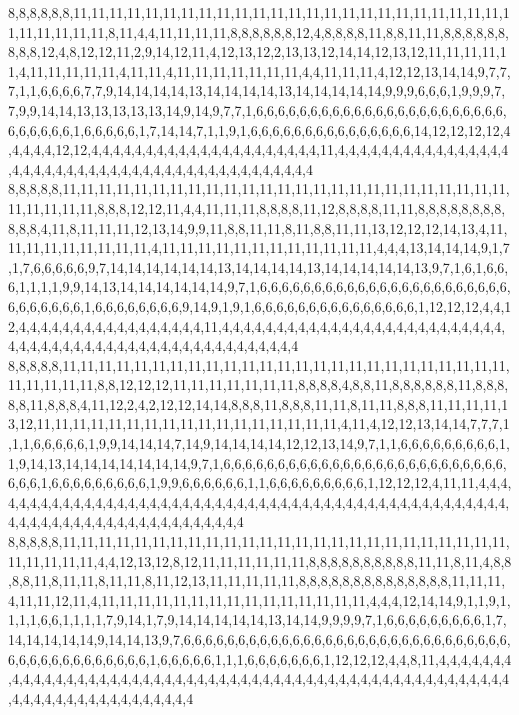 8,8,8,8,8,8,11,11,11,11,11,11,11,11,11,11,11,11,11,11,11,11,11,11,11,11,11,11,11,11,11,11,11,11,11,11,8,11,4,4,11,11,11,11,8,8,8,8,8,8,12,4,8,8,8,8,11,8,8,11,11,8,8,8,8,8,8,8,8,8,12,4,8,12,12,11,2,9,14,12,11,4,12,13,12,2,13,13,12,14,14,12,13,12,11,11,11,11,11,4,11,11,11,11,11,4,11,11,4,11,11,11,11,11,11,11,4,4,11,11,11,4,12,12,13,14,14,9,7,7,7,1,1,6,6,6,6,7,7,9,14,14,14,14,13,14,14,14,14,13,14,14,14,14,14,9,9,9,6,6,6,1,9,9,9,7,7,9,9,14,14,13,13,13,13,13,14,9,14,9,7,7,1,6,6,6,6,6,6,6,6,6,6,6,6,6,6,6,6,6,6,6,6,6,6,6,6,6,6,6,6,6,1,6,6,6,6,6,1,7,14,14,7,1,1,9,1,6,6,6,6,6,6,6,6,6,6,6,6,6,6,6,14,12,12,12,12,4,4,4,4,4,12,12,4,4,4,4,4,4,4,4,4,4,4,4,4,4,4,4,4,4,4,4,4,11,4,4,4,4,4,4,4,4,4,4,4,4,4,4,4,4,4,4,4,4,4,4,4,4,4,4,4,4,4,4,4,4,4,4,4,4,4,4,4,4,4,4,4,4
8,8,8,8,8,11,11,11,11,11,11,11,11,11,11,11,11,11,11,11,11,11,11,11,11,11,11,11,11,11,11,11,11,11,11,8,8,8,12,12,11,4,4,11,11,11,8,8,8,8,11,12,8,8,8,8,11,11,8,8,8,8,8,8,8,8,8,8,8,4,11,8,11,11,11,12,13,14,9,9,11,8,8,11,11,8,11,8,8,11,11,13,12,12,12,14,13,4,11,11,11,11,11,11,11,11,11,4,11,11,11,11,11,11,11,11,11,11,11,11,4,4,4,13,14,14,14,9,1,7,1,7,6,6,6,6,6,9,7,14,14,14,14,14,14,13,14,14,14,14,13,14,14,14,14,14,13,9,7,1,6,1,6,6,6,1,1,1,1,9,9,14,13,14,14,14,14,14,14,9,7,1,6,6,6,6,6,6,6,6,6,6,6,6,6,6,6,6,6,6,6,6,6,6,6,6,6,6,6,6,6,6,1,6,6,6,6,6,6,6,6,9,14,9,1,9,1,6,6,6,6,6,6,6,6,6,6,6,6,6,6,6,1,12,12,12,4,4,12,4,4,4,4,4,4,4,4,4,4,4,4,4,4,4,4,4,11,4,4,4,4,4,4,4,4,4,4,4,4,4,4,4,4,4,4,4,4,4,4,4,4,4,4,4,4,4,4,4,4,4,4,4,4,4,4,4,4,4,4,4,4,4,4,4,4,4,4,4,4,4
8,8,8,8,8,11,11,11,11,11,11,11,11,11,11,11,11,11,11,11,11,11,11,11,11,11,11,11,11,11,11,11,11,11,11,8,8,12,12,12,11,11,11,11,11,11,11,8,8,8,8,4,8,8,11,8,8,8,8,8,8,11,8,8,8,8,8,11,8,8,8,4,11,12,2,4,2,12,12,14,14,8,8,8,11,8,8,8,11,11,8,11,11,8,8,8,11,11,11,11,13,12,11,11,11,11,11,11,11,11,11,11,11,11,11,11,11,11,11,4,11,4,12,12,13,14,14,7,7,7,1,1,1,6,6,6,6,6,1,9,9,14,14,14,7,14,9,14,14,14,14,12,12,13,14,9,7,1,1,6,6,6,6,6,6,6,6,6,1,1,9,14,13,14,14,14,14,14,14,14,9,7,1,6,6,6,6,6,6,6,6,6,6,6,6,6,6,6,6,6,6,6,6,6,6,6,6,6,6,6,6,6,1,6,6,6,6,6,6,6,6,6,1,9,9,6,6,6,6,6,6,1,1,6,6,6,6,6,6,6,6,6,1,12,12,12,4,11,11,4,4,4,4,4,4,4,4,4,4,4,4,4,4,4,4,4,4,4,4,4,4,4,4,4,4,4,4,4,4,4,4,4,4,4,4,4,4,4,4,4,4,4,4,4,4,4,4,4,4,4,4,4,4,4,4,4,4,4,4,4,4,4,4,4,4,4,4,4,4,4
8,8,8,8,8,11,11,11,11,11,11,11,11,11,11,11,11,11,11,11,11,11,11,11,11,11,11,11,11,11,11,11,11,11,11,4,4,12,13,12,8,12,11,11,11,11,11,11,8,8,8,8,8,8,8,8,8,8,11,11,8,11,4,8,8,8,8,11,8,11,11,8,11,11,8,11,12,13,11,11,11,11,11,8,8,8,8,8,8,8,8,8,8,8,8,8,8,11,11,11,4,11,11,12,11,4,11,11,11,11,11,11,11,11,11,11,11,11,11,11,11,4,4,4,12,14,14,9,1,1,9,1,1,1,1,6,6,1,1,1,1,7,9,14,1,7,9,14,14,14,14,14,13,14,14,9,9,9,9,7,1,6,6,6,6,6,6,6,6,6,1,7,14,14,14,14,14,9,14,14,13,9,7,6,6,6,6,6,6,6,6,6,6,6,6,6,6,6,6,6,6,6,6,6,6,6,6,6,6,6,6,6,6,6,6,6,6,6,6,6,6,6,6,6,6,6,1,6,6,6,6,6,1,1,1,6,6,6,6,6,6,6,1,12,12,12,4,4,8,11,4,4,4,4,4,4,4,4,4,4,4,4,4,4,4,4,4,4,4,4,4,4,4,4,4,4,4,4,4,4,4,4,4,4,4,4,4,4,4,4,4,4,4,4,4,4,4,4,4,4,4,4,4,4,4,4,4,4,4,4,4,4,4,4,4,4,4,4,4,4
